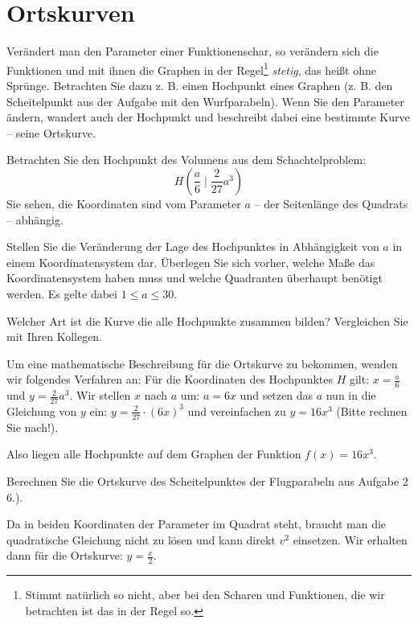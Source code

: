 \documentclass[12pt,a4paper,twoside,fleqn]{article}
\begin{document}
\section{Ortskurven}
Verändert man den Parameter einer Funktionenschar, so verändern sich
die Funktionen und mit ihnen die Graphen in der Regel\footnote{Stimmt
  natürlich so nicht, aber bei den Scharen und Funktionen, die wir
  betrachten ist das in der Regel so.}  \emph{stetig}, das
heißt ohne Sprünge. Betrachten Sie dazu z. B. einen Hochpunkt eines
Graphen (z. B. den Scheitelpunkt aus der Aufgabe mit den
Wurfparabeln). Wenn Sie den Parameter ändern, wandert auch der
Hochpunkt und beschreibt dabei eine bestimmte Kurve -- seine
Ortskurve.

Betrachten Sie den Hochpunkt des Volumens aus dem Schachtelproblem:
$$H\left(\frac a 6\mid\frac 2 {27}a^3\right)$$ %
Sie sehen, die Koordinaten sind vom Parameter $a$ -- der Seitenlänge
des Quadrats -- abhängig.

Stellen Sie die Veränderung der Lage des Hochpunktes in Abhängigkeit
von $a$ in einem Koordinatensystem dar. Überlegen Sie sich vorher,
welche Maße das Koordinatensystem haben muss und welche Quadranten
überhaupt benötigt werden. Es gelte dabei $1\leq a\leq 30$. 

Welcher Art ist die Kurve die alle Hochpunkte zusammen bilden?
Vergleichen Sie mit Ihren Kollegen.

Um eine mathematische Beschreibung für die Ortskurve zu bekommen,
wenden wir folgendes Verfahren an: 
Für die Koordinaten des Hochpunktes $H$ gilt: $x= \frac a 6$ und
$y=\frac 2 {27}a^3$. Wir stellen $x$ nach $a$ um: $a=6x$ und setzen
das $a$ nun in die Gleichung von $y$ ein: $y=\frac 2 {27}\cdot (6x)^3$
und vereinfachen zu $y=16x^3$ (Bitte rechnen Sie nach!).

Also liegen alle Hochpunkte auf dem Graphen der Funktion $f(x)=16x^3$.

\begin{question}

  Berechnen Sie die Ortskurve des Scheitelpunktes der Flugparabeln aus Aufgabe 2 6.).
\end{question}
\begin{solution}
  Da in beiden Koordinaten der Parameter im Quadrat steht, braucht man die quadratische Gleichung
  nicht zu lösen und kann direkt $v^2$ einsetzen. Wir erhalten dann für die Ortskurve: $y=\frac x 2$.
\end{solution}
\end{document}
